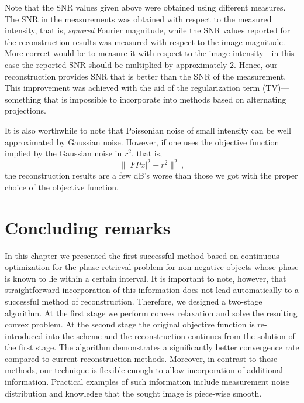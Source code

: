 Note that the SNR values given above were obtained using different
measures. The  SNR in the measurements was
obtained with respect to the measured intensity, that is,
\emph{squared} Fourier magnitude, while the SNR values reported for the
reconstruction results was measured with respect to the image
magnitude. More correct would be to measure it with respect to the
image intensity---in this case the reported SNR should be multiplied by
approximately 2. Hence, our reconstruction provides SNR that is better
than the SNR of the measurement. This improvement was achieved with
the aid of the regularization term (TV)---something that is impossible
to incorporate into methods based on alternating projections. 

It is also worthwhile to note that
Poissonian noise of small intensity can be well approximated by
Gaussian noise. However, if one uses the objective function implied by
the Gaussian noise in $r^2$, that is,
\begin{equation}
  \label{eq:3}
  \||FPx|^2 - r^2\|^2 \,, 
\end{equation}
the reconstruction results are a few dB's worse than those we got with
the proper choice of the objective function. 

\section{Concluding remarks}
\label{sec:approx-phase1-conclusions}
In this chapter we presented the first successful method based on
continuous optimization for the phase retrieval problem for
non-negative objects whose phase is known to lie within a certain
interval.  It is important to note, however, that straightforward
incorporation of this information does not lead automatically to a
successful method of reconstruction. Therefore, we designed a
two-stage algorithm.  At the first stage we perform convex relaxation
and solve the resulting convex problem. At the second stage the
original objective function is re-introduced into the scheme and the
reconstruction continues from the solution of the first stage.  The
algorithm demonstrates a significantly better convergence rate compared
to current reconstruction methods. Moreover, in contrast to these
methods, our technique is flexible enough to allow incorporation of
additional information. Practical examples of such information include
measurement noise distribution and  knowledge that the sought image
is piece-wise smooth.

